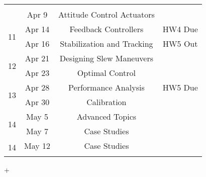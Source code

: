 \documentclass[11pt,letterpaper]{article}
\begin{document}
\begin{tabular}{c|c|c|c}
         &  \\
	 & Apr 9 & Attitude Control Actuators &   \\
	 \hline
	\multirow{2}{*}{11}  & Apr 14 & Feedback Controllers
         & HW4 Due \\
	 & Apr 16 & Stabilization and Tracking &  HW5 Out \\
	 \hline
	\multirow{2}{*}{12}  & Apr 21 & Designing Slew Maneuvers 
         &   \\
	 & Apr 23 & Optimal Control &   \\
	 \hline
	\multirow{2}{*}{13}  & Apr 28 & Performance Analysis
         & HW5 Due \\
	 & Apr 30 & Calibration &   \\
	 \hline
	\multirow{2}{*}{14}  & May 5 & Advanced Topics
         &  \\
	 & May 7 & Case Studies &   \\
	 \hline
	\multirow{2}{*}{14}  & May 12 &
        Case Studies &  \\
	 &  &  &   \\
\end{tabular}


+
\end{document}
